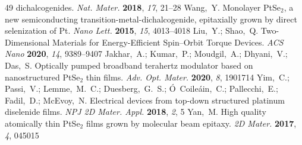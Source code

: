 \documentclass[journal=jacsat,manuscript=article]{achemso}
\begin{document}
\begin{mcitethebibliography}{49}
  dichalcogenides. \emph{Nat. Mater.} \textbf{2018}, \emph{17}, 21--28\relax
\mciteBstWouldAddEndPuncttrue
\mciteSetBstMidEndSepPunct{\mcitedefaultmidpunct}
{\mcitedefaultendpunct}{\mcitedefaultseppunct}\relax
\EndOfBibitem
{}
Wang,~Y.   Monolayer PtSe$_2$, a new semiconducting
  transition-metal-dichalcogenide, epitaxially grown by direct selenization of
  Pt. \emph{Nano Lett.} \textbf{2015}, \emph{15}, 4013--4018\relax
\mciteBstWouldAddEndPuncttrue
\mciteSetBstMidEndSepPunct{\mcitedefaultmidpunct}
{\mcitedefaultendpunct}{\mcitedefaultseppunct}\relax
\EndOfBibitem
{}
Liu,~Y.; Shao,~Q. Two-Dimensional Materials for Energy-Efficient Spin--Orbit
  Torque Devices. \emph{ACS Nano} \textbf{2020}, \emph{14}, 9389--9407\relax
\mciteBstWouldAddEndPuncttrue
\mciteSetBstMidEndSepPunct{\mcitedefaultmidpunct}
{\mcitedefaultendpunct}{\mcitedefaultseppunct}\relax
\EndOfBibitem
{}
Jakhar,~A.; Kumar,~P.; Moudgil,~A.; Dhyani,~V.; Das,~S. Optically pumped
  broadband terahertz modulator based on nanostructured PtSe$_2$ thin films.
  \emph{Adv. Opt. Mater.} \textbf{2020}, \emph{8}, 1901714\relax
\mciteBstWouldAddEndPuncttrue
\mciteSetBstMidEndSepPunct{\mcitedefaultmidpunct}
{\mcitedefaultendpunct}{\mcitedefaultseppunct}\relax
\EndOfBibitem
{}
Yim,~C.; Passi,~V.; Lemme,~M.~C.; Duesberg,~G.~S.; {\'O}~Coile{\'a}in,~C.;
  Pallecchi,~E.; Fadil,~D.; McEvoy,~N. Electrical devices from top-down
  structured platinum diselenide films. \emph{NPJ 2D Mater. Appl.}
  \textbf{2018}, \emph{2}, 5\relax
\mciteBstWouldAddEndPuncttrue
\mciteSetBstMidEndSepPunct{\mcitedefaultmidpunct}
{\mcitedefaultendpunct}{\mcitedefaultseppunct}\relax
\EndOfBibitem
{}
Yan,~M.   High quality atomically thin PtSe$_2$ films grown by
  molecular beam epitaxy. \emph{2D Mater.} \textbf{2017}, \emph{4},
  045015\relax
\mciteBstWouldAddEndPuncttrue
\mciteSetBstMidEndSepPunct{\mcitedefaultmidpunct}
{\mcitedefaultendpunct}{\mcitedefaultseppunct}\relax

\end{mcitethebibliography}
\end{document}
